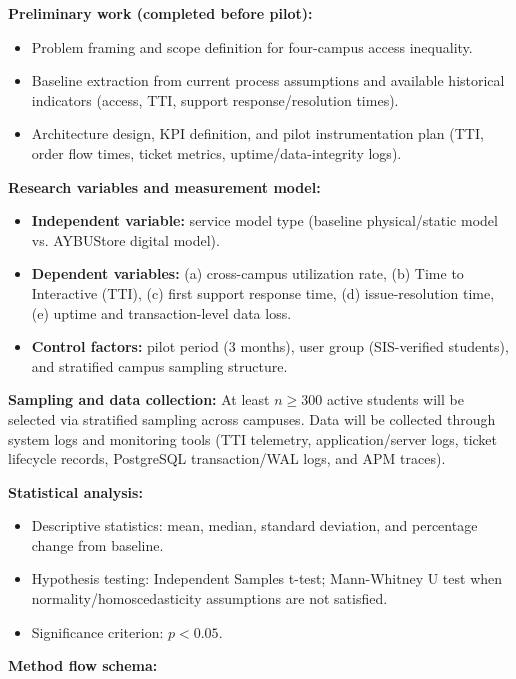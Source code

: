 \documentclass[10pt,a4paper]{article}
\begin{document}
\textbf{Preliminary work (completed before pilot):}
\begin{itemize}
    \item Problem framing and scope definition for four-campus access inequality.
    \item Baseline extraction from current process assumptions and available historical indicators (access, TTI, support response/resolution times).
    \item Architecture design, KPI definition, and pilot instrumentation plan (TTI, order flow times, ticket metrics, uptime/data-integrity logs).
\end{itemize}

\textbf{Research variables and measurement model:}
\begin{itemize}
    \item \textbf{Independent variable:} service model type (baseline physical/static model vs. AYBUStore digital model).
    \item \textbf{Dependent variables:} (a) cross-campus utilization rate, (b) Time to Interactive (TTI), (c) first support response time, (d) issue-resolution time, (e) uptime and transaction-level data loss.
    \item \textbf{Control factors:} pilot period (3 months), user group (SIS-verified students), and stratified campus sampling structure.
\end{itemize}

\textbf{Sampling and data collection:} At least $n \geq 300$ active students will be selected via stratified sampling across campuses. Data will be collected through system logs and monitoring tools (TTI telemetry, application/server logs, ticket lifecycle records, PostgreSQL transaction/WAL logs, and APM traces).

\textbf{Statistical analysis:}
\begin{itemize}
    \item Descriptive statistics: mean, median, standard deviation, and percentage change from baseline.
    \item Hypothesis testing: Independent Samples t-test; Mann-Whitney U test when normality/homoscedasticity assumptions are not satisfied.
    \item Significance criterion: $p < 0.05$.
\end{itemize}

\textbf{Method flow schema:}
\begin{center}
\end{center}
\end{document}
